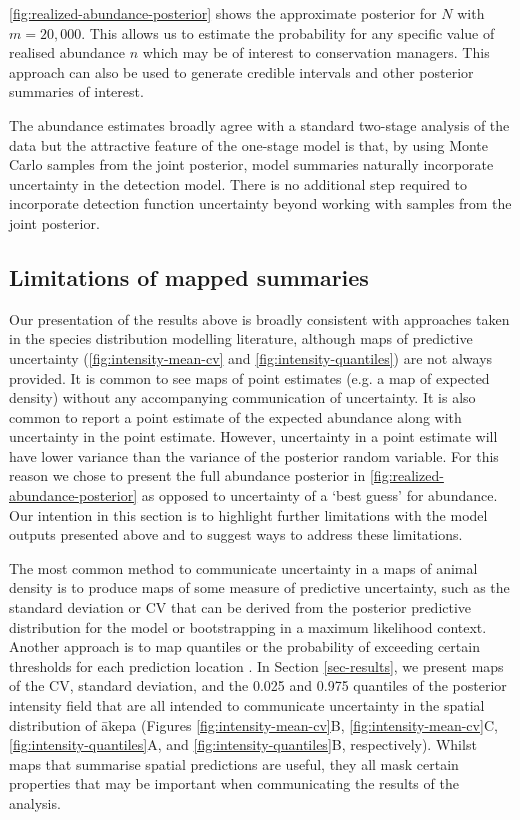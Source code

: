 \documentclass{stylefile16/statsoc}
\newcommand{\akepa}{\textquotesingle\={a}kepa}  %
\begin{document}
\autoref{fig:realized-abundance-posterior} shows the approximate posterior for $N$ with $m = 20,000$.  This allows us to estimate the probability for any specific value of realised abundance $n$ which may be of interest to conservation managers.  This approach can also be used to generate credible intervals and other posterior summaries of interest. 

The abundance estimates broadly agree with a standard two-stage analysis of the data \citep{camp_dsm_2020} but the attractive feature of the one-stage model is that, by using Monte Carlo samples from the joint posterior, model summaries naturally incorporate uncertainty in the detection model.  There is no additional step required to incorporate detection function uncertainty beyond working with samples from the joint posterior.

\vfill

\subsection{Limitations of mapped summaries}

Our presentation of the results above is broadly consistent with approaches taken in the species distribution modelling literature, although maps of predictive uncertainty (\autoref{fig:intensity-mean-cv} and \autoref{fig:intensity-quantiles}) are not always provided.  It is common to see maps of point estimates (e.g. a map of expected density) without any accompanying communication of uncertainty.  It is also common to report a point estimate of the expected abundance along with uncertainty in the point estimate.  However, uncertainty in a point estimate will have lower variance than the variance of the posterior random variable.  For this reason we chose to present the full abundance posterior in \autoref{fig:realized-abundance-posterior} as opposed to uncertainty of a `best guess' for abundance.  Our intention in this section is to highlight further limitations with the model outputs presented above and to suggest ways to address these limitations. 

The most common method to communicate uncertainty in a maps of animal density is to produce maps of some measure of predictive uncertainty, such as the standard deviation or CV \citep{fuller_novel_2018, vallejo_responses_2017,bradbury_mapping_2014} that can be derived from the posterior predictive distribution for the model or bootstrapping in a maximum likelihood context.  Another approach is to map quantiles or the probability of exceeding certain thresholds for each prediction location \citep{russell_avoidance_2016, wilson_hierarchical_2010}.  In Section \ref{sec-results}, we present maps of the CV, standard deviation, and the 0.025 and 0.975 quantiles of the posterior intensity field that are all intended to communicate uncertainty in the spatial distribution of \akepa{} (Figures \ref{fig:intensity-mean-cv}B, \ref{fig:intensity-mean-cv}C, \ref{fig:intensity-quantiles}A, and \ref{fig:intensity-quantiles}B, respectively).  Whilst maps that summarise spatial predictions are useful, they all mask certain properties that may be important when communicating the results of the analysis. 
\end{document}
